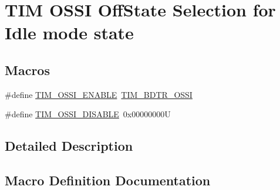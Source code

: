\hypertarget{group___t_i_m___o_s_s_i___off___state___selection__for___idle__mode__state}{}\section{T\+IM O\+S\+SI Off\+State Selection for Idle mode state}
\label{group___t_i_m___o_s_s_i___off___state___selection__for___idle__mode__state}
\subsection*{Macros}
\begin{DoxyCompactItemize}
\item 
\#define \hyperlink{group___t_i_m___o_s_s_i___off___state___selection__for___idle__mode__state_gae5b5901b177cd054cd5503630892680f}{T\+I\+M\+\_\+\+O\+S\+S\+I\+\_\+\+E\+N\+A\+B\+LE}~\hyperlink{group___peripheral___registers___bits___definition_gab1cf04e70ccf3d4aba5afcf2496a411a}{T\+I\+M\+\_\+\+B\+D\+T\+R\+\_\+\+O\+S\+SI}
\item 
\#define \hyperlink{group___t_i_m___o_s_s_i___off___state___selection__for___idle__mode__state_gab1a20c65a3d24ef770f8a2a14c24130b}{T\+I\+M\+\_\+\+O\+S\+S\+I\+\_\+\+D\+I\+S\+A\+B\+LE}~0x00000000U
\end{DoxyCompactItemize}


\subsection{Detailed Description}


\subsection{Macro Definition Documentation}
\mbox{\label{group___t_i_m___o_s_s_i___off___state___selection__for___idle__mode__state_gab1a20c65a3d24ef770f8a2a14c24130b}} 
